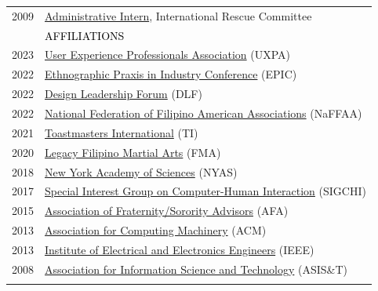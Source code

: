 \documentclass[12pt]{article}
\begin{document}
{\begin{longtable}{R{0.75in}p{5.0in}}
\footnotesize{2009} & \href{https://www.rescue.org}{Administrative Intern}, International Rescue Committee \medskip \\

& \large \textcolor{black}{\uppercase{Affiliations}}\\

\footnotesize{2023} & 
\href{https://uxpa.org/}{{User Experience Professionals Association}} (UXPA) \\

\footnotesize{2022} & 
\href{https://www.epicpeople.org/}{{Ethnographic Praxis in Industry Conference}} (EPIC) \\

\footnotesize{2022} & 
\href{https://www.invisionapp.com/future-of-work/design-leadership}{{Design Leadership Forum}} (DLF) \\

\footnotesize{2022} & \href{https://naffaa.org/}{National Federation of Filipino American Associations} (NaFFAA)\\

\footnotesize{2021} & \href{https://www.toastmasters.org/}{Toastmasters International} (TI)\\

\footnotesize{2020} & \href{https://www.legacyfma.com/team-3}{Legacy Filipino Martial Arts} (FMA)\\

\footnotesize{2018} & \href{https://www.nyas.org/}{New York Academy of Sciences} (NYAS)\\

\footnotesize{2017} & \href{https://www.sigchi.org/}{Special Interest Group on Computer-Human Interaction} (SIGCHI)\\

\footnotesize{2015} & \href{https://www.acm.org/}{Association of Fraternity/Sorority Advisors} (AFA)\\

\footnotesize{2013} & \href{https://dl.acm.org/profile/88158835957}{Association for Computing Machinery} (ACM)\\

\footnotesize{2013} & \href{https://www.ieee.org/}{Institute of Electrical and Electronics Engineers} (IEEE)\\

\footnotesize{2008} & \href{https://www.asist.org/}{Association for Information Science and Technology} (ASIS\&T) \medskip \\ \pagebreak


\end{longtable}}
\end{document}
